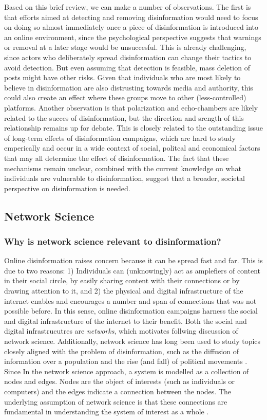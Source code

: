 Based on this brief review, we can make a number of observations. The first is that efforts aimed at detecting and removing disinformation would need to focus on doing so almost immediately once a piece of disinformation is introduced into an online environment, since the psychological perspective suggests that warnings or removal at a later stage would be unsuccesful. This is already challenging, since actors who deliberately spread disinformation can change their tactics to avoid detection. But even assuming that detection is feasible, mass deletion of posts might have other risks. Given that individuals who are most likely to believe in disinformation are also distrusting towards media and authority, this could also create an effect where these groups move to other (less-controlled) platforms. 
Another observation is that polarization and echo-chambers are likely related to the succes of disinformation, but the direction and srength of this relationship remains up for debate. This is closely related to the outstanding issue of long-term effects of disinformation campaigns, which are hard to study emperically and occur in a wide context of social, politcal and economical factors that may all determine the effect of disinformation. The fact that these mechanisms remain unclear, combined with the current knowledge on what individuals are vulnerable to disinformation, suggest that a broader, societal perspective on disinformation is needed.


\subsection{Network Science}
\subsubsection{Why is network science relevant to disinformation?}
Online disinformation raises concern because it can be spread fast and far. This is due to two reasons: 1) Individuals can (unknowingly) act as amplefiers of content in their social circle, by easily sharing content with their connections or by drawing attention to it, and 2) the physical and digital infrastructure of the internet enables and encourages a number and span of connections that was not possible before. In this sense, online disinformation campaigns harness the social and digital infrastructure of the internet to their benefit. Both the social and digital infrastrucutres are \textit{networks}, which motivates follwing discussion of network science. Additionally, network science has long been used to study topics closely aligned with the problem of disinformation, such as the diffusion of information over a population and the rise (and fall) of political movements \citep{Guilbeault2018}. Since In the network science approach, a system is modelled as a collection of nodes and edges. Nodes are the object of interests (such as individuals or computers) and the edges indicate a connection between the nodes. The underlying assumption of network science is that these connections are fundamental in understanding the system of interest as a whole \citep{Brandes2013}.  \\

